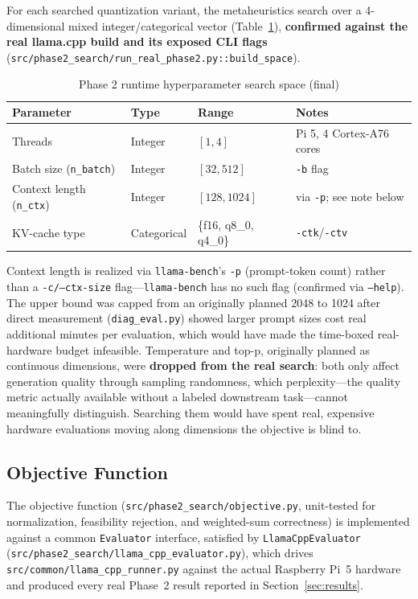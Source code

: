 \documentclass[journal]{IEEEtran}
\begin{document}
For each searched quantization variant, the metaheuristics search over a 4-dimensional mixed integer/categorical vector (Table~\ref{tab:runtime-params}), \textbf{confirmed against the real llama.cpp build and its exposed CLI flags} (\texttt{src/phase2\_search/run\_real\_phase2.py::build\_space}).

\begin{table}[t]
\caption{Phase 2 runtime hyperparameter search space (final)}
\label{tab:runtime-params}
\centering
\footnotesize
\begin{tabular}{@{}p{1.7cm}p{1.1cm}p{1.4cm}p{2.3cm}@{}}
\toprule
Parameter & Type & Range & Notes \\
\midrule
Threads & Integer & $[1,4]$ & Pi 5, 4 Cortex-A76 cores \\
Batch size (\texttt{n\_batch}) & Integer & $[32,512]$ & \texttt{-b} flag \\
Context length (\texttt{n\_ctx}) & Integer & $[128,1024]$ & via \texttt{-p}; see note below \\
KV-cache type & Categorical & \{f16, q8\_0, q4\_0\} & \texttt{-ctk}/\texttt{-ctv} \\
\bottomrule
\end{tabular}
\end{table}

Context length is realized via \texttt{llama-bench}'s \texttt{-p} (prompt-token count) rather than a \texttt{-c/--ctx-size} flag---\texttt{llama-bench} has no such flag (confirmed via \texttt{--help}). The upper bound was capped from an originally planned 2048 to 1024 after direct measurement (\texttt{diag\_eval.py}) showed larger prompt sizes cost real additional minutes per evaluation, which would have made the time-boxed real-hardware budget infeasible. Temperature and top-p, originally planned as continuous dimensions, were \textbf{dropped from the real search}: both only affect generation quality through sampling randomness, which perplexity---the quality metric actually available without a labeled downstream task---cannot meaningfully distinguish. Searching them would have spent real, expensive hardware evaluations moving along dimensions the objective is blind to.

\subsection{Objective Function}
\label{sec:objective}

The objective function (\texttt{src/phase2\_search/objective.py}, unit-tested for normalization, feasibility rejection, and weighted-sum correctness) is implemented against a common \texttt{Evaluator} interface, satisfied by \texttt{LlamaCppEvaluator} (\texttt{src/phase2\_search/llama\_cpp\_evaluator.py}), which drives \texttt{src/common/llama\_cpp\_runner.py} against the actual Raspberry Pi~5 hardware and produced every real Phase~2 result reported in Section~\ref{sec:results}.
\end{document}
